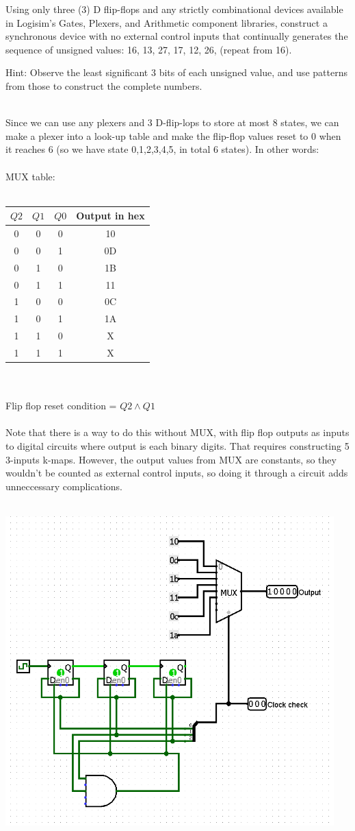 \item[8] Using only three (3) D flip-flops and any strictly combinational devices available in Logisim's Gates, Plexers, and Arithmetic component libraries, construct a synchronous device with no external control inputs that continually generates the sequence of unsigned values: 16, 13, 27, 17, 12, 26, (repeat from 16).

  Hint: Observe the least significant 3 bits of each unsigned value, and use patterns from those to construct the complete numbers.
\\{\color{NavyBlue}
\\Since we can use any plexers and 3 D-flip-lops to store at most 8 states, we can make a plexer into a look-up table and make the flip-flop values reset to 0 when it reaches 6 (so we have state 0,1,2,3,4,5, in total 6 states). In other words:
\\
\\MUX table:
\\
\\\begin{tabular}{c c c | c}
    $Q2$ & $Q1$ & $Q0$ & Output in hex \\
    \hline
    0 & 0 & 0 & 10 \\
    0 & 0 & 1 & 0D \\
    0 & 1 & 0 & 1B \\
    0 & 1 & 1 & 11 \\
    1 & 0 & 0 & 0C \\
    1 & 0 & 1 & 1A \\
    1 & 1 & 0 & X \\
    1 & 1 & 1 & X \\
    \end{tabular}
    \\
    \\ Flip flop reset condition = $Q2 \land Q1$
    \\
    \\Note that there is a way to do this without MUX, with flip flop outputs as inputs to digital circuits where output is each binary digits. That requires constructing 5 3-inputs k-maps. However, the output values from MUX are constants, so they wouldn't be counted as external control inputs, so doing it through a circuit adds unneccessary complications.
    }
    \\
    \includegraphics[width=5in]{q3.PNG}
    
\newpage